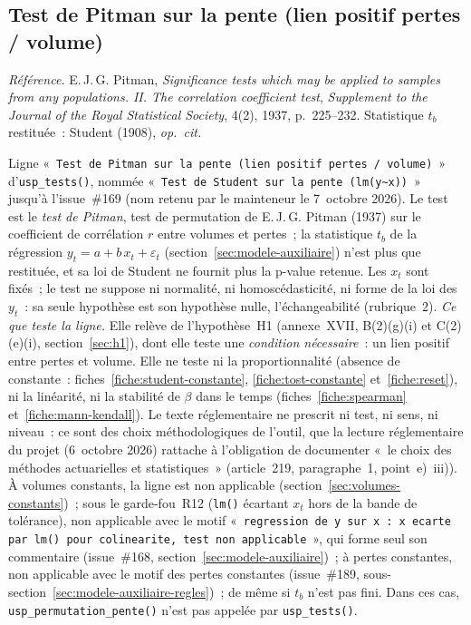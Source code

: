 \documentclass[a4paper,11pt]{article}
\newcommand{\code}[1]{\texttt{\small #1}}
\newcommand{\refl}[1]{{\small\textcolor{maincolor!70!black}{\textit{Référence.} #1}}\par\smallskip}
\newcounter{ficheid}
\newenvironment{fiche}[1]{%
  \stepcounter{ficheid}%
  \phantomsection
  \subsection{#1}%
  \label{fiche:\theficheid}%
}{%
  \end{description}\vspace{0.5em}%
}
\newcommand{\Cadre}{%
  \begin{description}[leftmargin=0pt, style=unboxed, itemsep=3pt, topsep=3pt, parsep=2pt]%
  \item[\textcolor{financeblue}{\textbf{1. Cadre, notations et hypothèses de validité (non testées).}}]}
\begin{document}
\begin{fiche}{Test de Pitman sur la pente (lien positif pertes / volume)}
\label{fiche:student-pente}%
\refl{E.\,J.\,G. Pitman, \emph{Significance tests which may be applied to samples from any
populations. II. The correlation coefficient test}, \emph{Supplement to the Journal of the Royal
Statistical Society}, 4(2), 1937, p.~225--232. Statistique $t_b$ restituée~: Student (1908),
\emph{op.\ cit.}}
\Cadre
Ligne «~\code{Test de Pitman sur la pente (lien positif pertes / volume)}~» d'\code{usp\_tests()},
nommée «~\code{Test de Student sur la pente (lm(y\textasciitilde x))}~» jusqu'à l'issue~\#169 (nom
retenu par le mainteneur le 7~octobre 2026). Le test est le \emph{test de Pitman}, test de
permutation de E.\,J.\,G. Pitman (1937) sur le coefficient de corrélation $r$ entre volumes et
pertes~; la statistique $t_b$ de la régression $y_t = a + b\,x_t + \varepsilon_t$
(section~\ref{sec:modele-auxiliaire}) n'est plus que restituée, et sa loi de Student ne fournit
plus la p-value retenue. Les $x_t$ sont fixés~; le test ne suppose ni normalité, ni
homoscédasticité, ni forme de la loi des $y_t$~: sa seule hypothèse est son hypothèse nulle,
l'échangeabilité (rubrique~2). \emph{Ce que teste la ligne.} Elle relève de l'hypothèse~H1
(annexe~XVII, B(2)(g)(i) et C(2)(e)(i), section~\ref{sec:h1}), dont elle teste une
\emph{condition nécessaire}~: un lien positif entre pertes et volume. Elle ne teste ni la
proportionnalité (absence de constante~: fiches~\ref{fiche:student-constante},
\ref{fiche:tost-constante} et~\ref{fiche:reset}), ni la linéarité, ni la stabilité de $\beta$
dans le temps (fiches~\ref{fiche:spearman} et~\ref{fiche:mann-kendall}). Le texte réglementaire
ne prescrit ni test, ni sens, ni niveau~: ce sont des choix méthodologiques de l'outil, que la
lecture réglementaire du projet (6~octobre 2026) rattache à l'obligation de documenter «~le choix
des méthodes actuarielles et statistiques~» (article~219, paragraphe~1, point~e)~iii)). À volumes
constants, la ligne est non applicable (section~\ref{sec:volumes-constants})~; sous le
garde-fou~R12 (\code{lm()} écartant $x_t$ hors de la bande de tolérance), non applicable avec le
motif «~\code{regression de y sur x : x ecarte par lm() pour colinearite, test non applicable}~»,
qui forme seul son commentaire (issue~\#168, section~\ref{sec:modele-auxiliaire})~; à pertes
constantes, non applicable avec le motif des pertes constantes (issue~\#189,
sous-section~\ref{sec:modele-auxiliaire-regles})~; de même si $t_b$ n'est pas fini. Dans ces cas,
\code{usp\_permutation\_pente()} n'est pas appelée par \code{usp\_tests()}.

\end{fiche}
\end{document}
